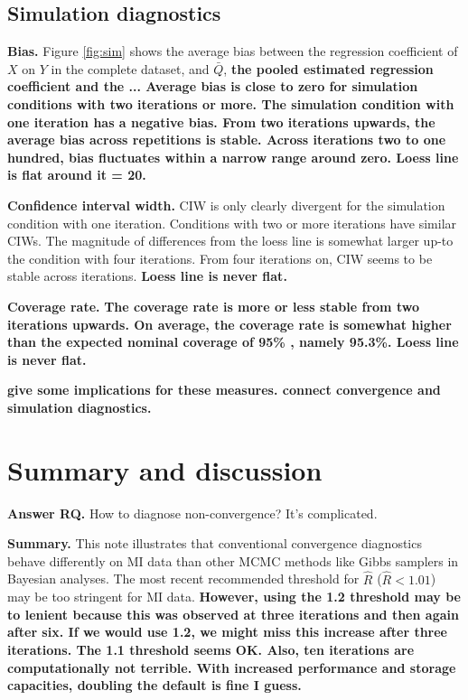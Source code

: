 \documentclass[article]{jss}
\begin{document}
\subsection{Simulation diagnostics}
\textbf{Bias.} Figure \ref{fig:sim} shows the average bias between the regression coefficient of $X$ on $Y$ in the complete dataset, and $\bar{Q}$, \textbf{the pooled estimated regression coefficient and the ... Average bias is close to zero for simulation conditions with two iterations or more. The simulation condition with one iteration has a negative bias. From two iterations upwards, the average bias across repetitions is stable. Across iterations two to one hundred, bias fluctuates within a narrow range around zero. Loess line is flat around it = 20.} 

\textbf{Confidence interval width.} CIW is only clearly divergent for the simulation condition with one iteration. Conditions with two or more iterations have similar CIWs. The magnitude of differences from the loess line is somewhat larger up-to the condition with four iterations. From four iterations on, CIW seems to be stable across iterations. \textbf{Loess line is never flat.}%

\textbf{Coverage rate.} \textbf{The coverage rate is more or less stable from two iterations upwards. On average, the coverage rate is somewhat higher than the expected nominal coverage of 95\% \cite{neym34}, namely 95.3\%. Loess line is never flat.}

\textbf{give some implications for these measures. connect convergence and simulation diagnostics.}


\section{Summary and discussion} \label{sec:summary}

\textbf{Answer RQ.} How to diagnose non-convergence? It's complicated.

\textbf{Summary.}
This note illustrates that conventional convergence diagnostics behave differently on MI data than other MCMC methods like Gibbs samplers in Bayesian analyses. The most recent recommended threshold for $\widehat{R}$ ($\widehat{R} < 1.01$) may be too stringent for MI data. \textbf{However, using the 1.2 threshold may be to lenient because this was observed at three iterations and then again after six. If we would use 1.2, we might miss this increase after three iterations. The 1.1 threshold seems OK. Also, ten iterations are computationally not terrible. With increased performance and storage capacities, doubling the default is fine I guess.}
\end{document}
